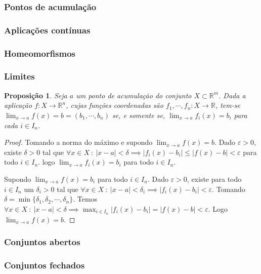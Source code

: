 \documentclass{article}
\newtheorem{prop}{Proposição}[section]
\theoremstyle{theorem}
\theoremstyle{lemma}
\theoremstyle{definition}
\theoremstyle{remark}
\begin{document}
   \subsubsection{Pontos de acumulação}
   \subsubsection{Aplicações contínuas}
   \subsubsection{Homeomorfismos}
   \subsubsection{Limites}
   \begin{prop}
	\label{propLimites}
	   Seja \(a\) um ponto de acumulação do conjunto \(X\subset \mathbb{R}^m\). Dada a aplicação \(f:X\to \mathbb{R}^n\), cujas funções coordenadas são \(f_1,\cdots,f_n:X \to \mathbb{R}\), tem-se \(\displaystyle\lim_{x\to a} f(x) = b = (b_1, \cdots, b_n)\) se, e somente se, \(\displaystyle\lim_{x\to a} f_i(x) = b_i\) para cada \(i \in I_n\).
   \end{prop}
   \begin{proof}
	   Tomando a norma do máximo e supondo $\displaystyle\lim_{x\to a} f(x) = b$. Dado $\varepsilon>0$, existe $\delta >0$ tal que $\forall x \in X \: : \: |x-a| < \delta \implies  |f_i(x) - b_i | \leq |f(x) - b| < \varepsilon$ para  todo $i\in I_n$.  logo $\displaystyle\lim_{x\to a} f_i(x) = b_i$ para todo $i\in I_n$.

	   Supondo $\displaystyle\lim_{x\to a} f(x)  = b_i$ para todo $i\in I_n$. Dado $\varepsilon >0$, existe para todo $i\in I_n$ um $\delta_i > 0 $ tal que $\forall x\in X \: : \: |x-a| < \delta_i \implies |f_i(x) - b_i | < \varepsilon$. Tomando $\delta = \min\{ \delta_1,\delta_2,\cdots, \delta_n\}$. Temos $\forall x\in X \: : \: |x-a|<\delta \implies \displaystyle\max_{i\in I_n} |f_i(x) -b_i| = |f(x) -b| < \varepsilon$. Logo \(\displaystyle \lim_{x\to a} f(x) = b\).
   \end{proof}
   \subsubsection{ Conjuntos abertos}
   \subsubsection{ Conjuntos fechados}
\end{document}
